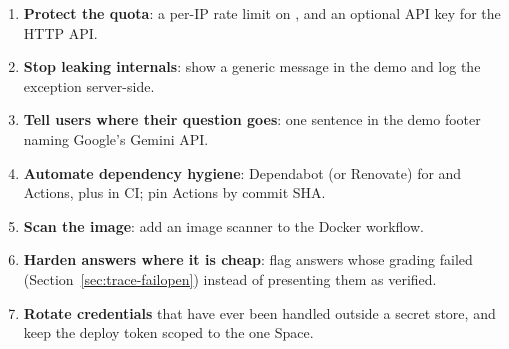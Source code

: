 \begin{recommended}
\begin{enumerate}
  \item \textbf{Protect the quota}: a per-IP rate limit on , and an optional API key for the HTTP API.
  \item \textbf{Stop leaking internals}: show a generic message in the demo and log the exception server-side.
  \item \textbf{Tell users where their question goes}: one sentence in the demo footer naming Google's Gemini API.
  \item \textbf{Automate dependency hygiene}: Dependabot (or Renovate) for  and Actions, plus  in CI; pin Actions by commit SHA.
  \item \textbf{Scan the image}: add an image scanner to the Docker workflow.
  \item \textbf{Harden answers where it is cheap}: flag answers whose grading failed (Section~\ref{sec:trace-failopen}) instead of presenting them as verified.
  \item \textbf{Rotate credentials} that have ever been handled outside a secret store, and keep the deploy token scoped to the one Space.
\end{enumerate}
\end{recommended}
